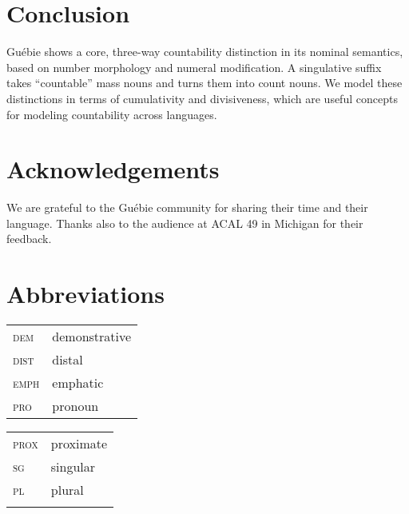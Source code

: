 \documentclass[output=paper,colorlinks,citecolor=brown]{langscibook}
\begin{document}
\section{Conclusion}\label{sec:sande:5}

Guébie shows a core, three-way countability distinction in its nominal semantics, based on number morphology and numeral modification. A singulative suffix takes ``countable'' mass nouns and turns them into count nouns. We model these distinctions in terms of cumulativity and divisiveness, which are useful concepts for modeling countability across languages.

\section*{Acknowledgements}

We are grateful to the Guébie community for sharing their time and their language. Thanks also to the audience at ACAL 49 in Michigan for their feedback.

\section*{Abbreviations}
\begin{tabularx}{.55\textwidth}{ll}
\textsc{dem} & demonstrative\\
\textsc{dist} & distal\\
\textsc{emph} & emphatic\\
\textsc{pro} & pronoun\\
\end{tabularx}
\begin{tabularx}{.45\textwidth}{ll}
\textsc{prox} & proximate\\
\textsc{sg} & singular\\
\textsc{pl} & plural\\
\\
\end{tabularx}

\newpage
\end{document}
